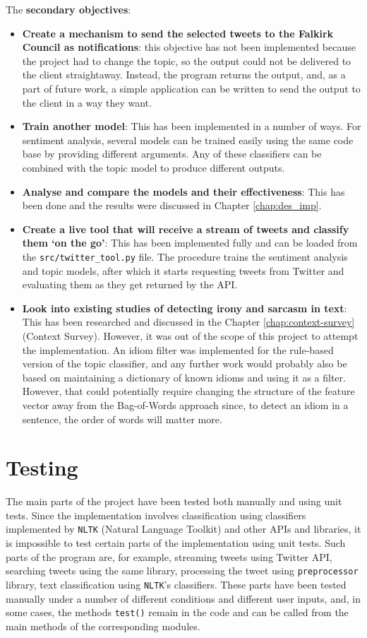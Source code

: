 The \textbf{secondary objectives}:
\begin{itemize}
    \item \textbf{Create a mechanism to send the selected tweets to the Falkirk Council as notifications}: this objective has not been implemented because the project had to change the topic, so the output could not be delivered to the client straightaway. Instead, the program returns the output, and, as a part of future work, a simple application can be written to send the output to the client in a way they want.
    \item \textbf{Train another model}: This has been implemented in a number of ways. For sentiment analysis, several models can be trained easily using the same code base by providing different arguments. Any of these classifiers can be combined with the topic model to produce different outputs. 
    \item \textbf{Analyse and compare the models and their effectiveness}: This has been done and the results were discussed in Chapter \ref{chap:des_imp}.
    \item \textbf{Create a live tool that will receive a stream of tweets and classify them `on the go'}: This has been implemented fully and can be loaded from the \texttt{src/twitter\_tool.py} file. The procedure trains the sentiment analysis and topic models, after which it starts requesting tweets from Twitter and evaluating them as they get returned by the API.
    \item \textbf{Look into existing studies of detecting irony and sarcasm in text}: This has been researched and discussed in the Chapter \ref{chap:context-survey} (Context Survey). However, it was out of the scope of this project to attempt the implementation. An idiom filter was implemented for the rule-based version of the topic classifier, and any further work would probably also be based on maintaining a dictionary of known idioms and using it as a filter. However, that could potentially require changing the structure of the feature vector away from the Bag-of-Words approach since, to detect an idiom in a sentence, the order of words will matter more.  
\end{itemize}

\section{Testing}
\label{sec:testing}

The main parts of the project have been tested both manually and using unit tests. 
Since the implementation involves classification using classifiers implemented by \texttt{NLTK} (Natural Language Toolkit) and other APIs and libraries, it is impossible to test certain parts of the implementation using unit tests. Such parts of the program are, for example, streaming tweets using Twitter API, searching tweets using the same library, processing the tweet using \texttt{preprocessor} library, text classification using \texttt{NLTK}'s classifiers. These parts have been tested manually under a number of different conditions and different user inputs, and, in some cases, the methods \texttt{test()} remain in the code and can be called from the main methods of the corresponding modules.

